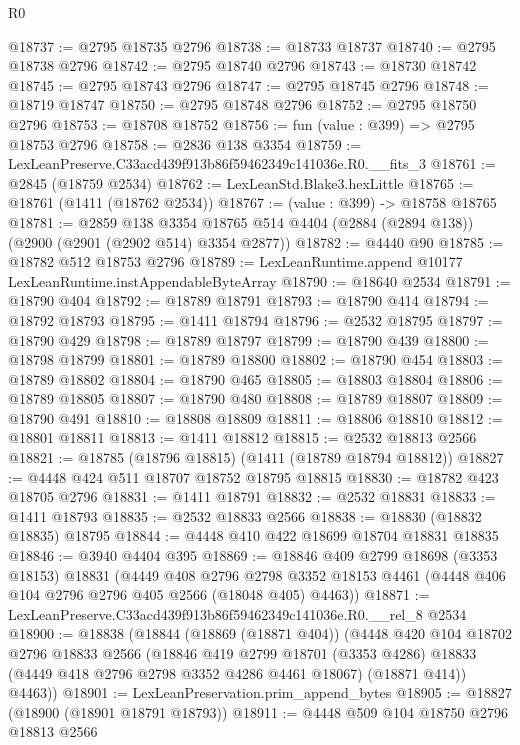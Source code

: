 \begin{lexlean}{R0}
\begin{coremodule}
@18737 := @2795 @18735 @2796
@18738 := @18733 @18737
@18740 := @2795 @18738 @2796
@18742 := @2795 @18740 @2796
@18743 := @18730 @18742
@18745 := @2795 @18743 @2796
@18747 := @2795 @18745 @2796
@18748 := @18719 @18747
@18750 := @2795 @18748 @2796
@18752 := @2795 @18750 @2796
@18753 := @18708 @18752
@18756 := fun (value : @399) => @2795 @18753 @2796
@18758 := @2836 @138 @3354
@18759 := LexLeanPreserve.C33acd439f913b86f59462349c141036e.R0.__fits_3
@18761 := @2845 (@18759 @2534)
@18762 := LexLeanStd.Blake3.hexLittle
@18765 := @18761 (@1411 (@18762 @2534))
@18767 := (value : @399) -> @18758 @18765
@18781 := @2859
    @138
    @3354
    @18765
    @514
    @4404
    (@2884 (@2894 @138))
    (@2900 (@2901 (@2902 @514) @3354 @2877))
@18782 := @4440 @90
@18785 := @18782 @512 @18753 @2796
@18789 := LexLeanRuntime.append @10177 LexLeanRuntime.instAppendableByteArray
@18790 := @18640 @2534
@18791 := @18790 @404
@18792 := @18789 @18791
@18793 := @18790 @414
@18794 := @18792 @18793
@18795 := @1411 @18794
@18796 := @2532 @18795
@18797 := @18790 @429
@18798 := @18789 @18797
@18799 := @18790 @439
@18800 := @18798 @18799
@18801 := @18789 @18800
@18802 := @18790 @454
@18803 := @18789 @18802
@18804 := @18790 @465
@18805 := @18803 @18804
@18806 := @18789 @18805
@18807 := @18790 @480
@18808 := @18789 @18807
@18809 := @18790 @491
@18810 := @18808 @18809
@18811 := @18806 @18810
@18812 := @18801 @18811
@18813 := @1411 @18812
@18815 := @2532 @18813 @2566
@18821 := @18785 (@18796 @18815) (@1411 (@18789 @18794 @18812))
@18827 := @4448 @424 @511 @18707 @18752 @18795 @18815
@18830 := @18782 @423 @18705 @2796
@18831 := @1411 @18791
@18832 := @2532 @18831
@18833 := @1411 @18793
@18835 := @2532 @18833 @2566
@18838 := @18830 (@18832 @18835) @18795
@18844 := @4448 @410 @422 @18699 @18704 @18831 @18835
@18846 := @3940 @4404 @395
@18869 := @18846
    @409
    @2799
    @18698
    (@3353 @18153)
    @18831
    (@4449
      @408
      @2796
      @2798
      @3352
      @18153
      @4461
      (@4448 @406 @104 @2796 @2796 @405 @2566 (@18048 @405) @4463))
@18871 := LexLeanPreserve.C33acd439f913b86f59462349c141036e.R0.__rel_8 @2534
@18900 := @18838
    (@18844
      (@18869 (@18871 @404))
      (@4448
        @420
        @104
        @18702
        @2796
        @18833
        @2566
        (@18846
          @419
          @2799
          @18701
          (@3353 @4286)
          @18833
          (@4449 @418 @2796 @2798 @3352 @4286 @4461 @18067)
          (@18871 @414))
        @4463))
@18901 := LexLeanPreservation.prim_append_bytes
@18905 := @18827 (@18900 (@18901 @18791 @18793))
@18911 := @4448 @509 @104 @18750 @2796 @18813 @2566

\end{coremodule}
\end{lexlean}
